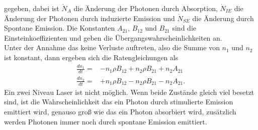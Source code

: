 gegeben, dabei ist $\dot{N}_A$ die Änderung der Photonen durch Absorption, $\dot{N}_{IE}$ die Änderung der Photonen durch induzierte Emission und $\dot{N}_{SE}$ die Änderung durch Spontane Emission. Die Konstanten $A_{21}$, $B_{12}$ und $B_{21}$ sind die Einsteinkoeffizienten und geben die Übergangswahrscheinlichkeiten an.\\
Unter der Annahme das keine Verluste auftreten, also die Summe von $n_1$ und $n_2$ ist konstant, dann ergeben sich die Ratengleichungen als
\begin{align*}
\frac{dn_1}{dt}=&-n_1 \rho B_{12} + n_2\rho B_{21} + n_2 A_{21}\\
\frac{dn_2}{dt}=&+n_1\rho B_{12} - n_2\rho B_{21} -n_2A_{21}.
\end{align*}
Ein zwei Niveau Laser ist nicht möglich. Wenn beide Zustände gleich viel besetzt sind, ist die Wahrscheinlichkeit das ein Photon durch stimulierte Emission emittiert wird, genauso groß wie das ein Photon absorbiert wird, zusätzlich werden Photonen immer noch durch spontane Emission emittiert.

